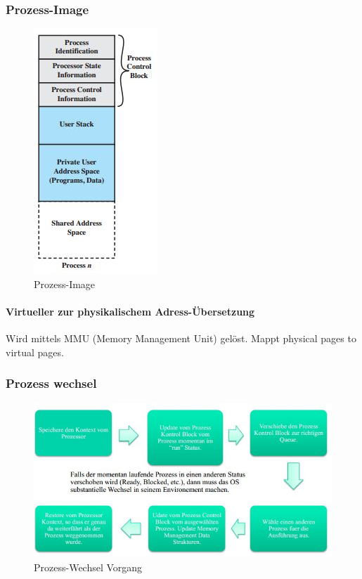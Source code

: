 \newpage
\subsubsection{Prozess-Image}
\begin{figure}[h!]
\centering
\includegraphics[width=0.2\linewidth]{fig/system-software-prozess-image}
\caption{Prozess-Image}
\label{fig:system-software-prozess-image}
\end{figure}

\paragraph{Virtueller zur physikalischem Adress-Übersetzung}
Wird mittels MMU (Memory Management Unit) gelöst. Mappt physical pages to virtual pages. \\

\subsubsection{Prozess wechsel}
\begin{figure}[h!]
\centering
\includegraphics[width=0.7\linewidth]{fig/system-software-prozess-wechsel}
\caption{Prozess-Wechsel Vorgang}
\label{fig:system-software-prozess-wechsel}
\end{figure}

\newpage
